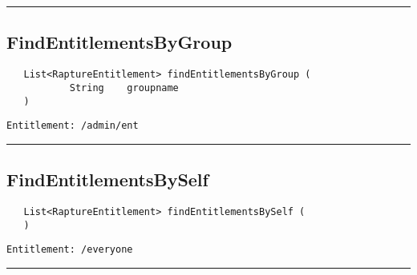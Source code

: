 \rule{12cm}{2pt}
\subsection{FindEntitlementsByGroup}
\label{Api:FindEntitlementsByGroup}
\begin{verbatim}
   List<RaptureEntitlement> findEntitlementsByGroup (
           String    groupname
   )
\end{verbatim}
\begin{Verbatim}[fontsize=\small, formatcom=\color{Maroon}]
  Entitlement: /admin/ent
\end{Verbatim}



\rule{12cm}{2pt}
\subsection{FindEntitlementsBySelf}
\label{Api:FindEntitlementsBySelf}
\begin{verbatim}
   List<RaptureEntitlement> findEntitlementsBySelf (
   )
\end{verbatim}
\begin{Verbatim}[fontsize=\small, formatcom=\color{Maroon}]
  Entitlement: /everyone
\end{Verbatim}



\rule{12cm}{2pt}
